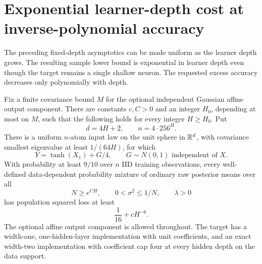 \section{Exponential learner-depth cost at inverse-polynomial accuracy}
\label{sec:finite-depth-rate}
The preceding fixed-depth asymptotics can be made uniform as the learner depth grows. The resulting sample lower bound is exponential in learner depth even though the target remains a single shallow neuron. The requested excess accuracy decreases only polynomially with depth.

\begin{theorem}
\label{thm:finite-depth-rate}
Fix a finite covariance bound $M$ for the optional independent Gaussian affine output component. There are constants $c,C>0$ and an integer $H_0$, depending at most on $M$, such that the following holds for every integer $H\ge H_0$. Put
\[
 d=4H+2,\qquad n=4\cdot256^H.
\]
There is a uniform $n$-atom input law on the unit sphere in $\mathbb R^d$, with covariance smallest eigenvalue at least $1/(64H)$, for which
\[
 Y=\tanh(X_1)+G/4,\qquad G\sim N(0,1)\text{ independent of }X.
\]
With probability at least $9/10$ over $n$ IID training observations, every well-defined data-dependent probability mixture of ordinary raw posterior means over all
\[
 N\ge e^{CH},\qquad 0<\sigma^2\le1/N,\qquad \lambda>0
\]
has population squared loss at least
\[
 \frac1{16}+cH^{-6}.
\]
The optional affine output component is allowed throughout. The target has a width-one, one-hidden-layer implementation with unit coefficients, and an exact width-two implementation with coefficient cap four at every hidden depth on the data support.
\end{theorem}
